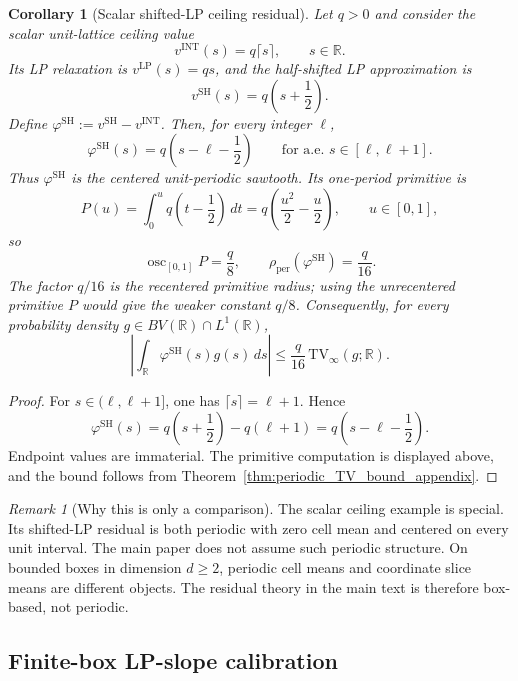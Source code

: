 \documentclass[11pt,letterpaper]{article}
\newtheorem{corollary}[theorem]{Corollary}
\theoremstyle{definition}
\theoremstyle{remark}
\newtheorem{remark}[theorem]{Remark}
\newcommand{\INT}{\mathrm{INT}}
\newcommand{\LP}{\mathrm{LP}}
\newcommand{\SH}{\mathrm{SH}}
\newcommand{\TV}{\mathrm{TV}}
\begin{document}
\begin{corollary}[Scalar shifted-LP ceiling residual]
\label{cor:scalar_shifted_lp_ceiling_residual}
Let $q>0$ and consider the scalar unit-lattice ceiling value
$$
v^{\INT}(s)=q\lceil s\rceil,
\qquad s\in\mathbb R.
$$
Its LP relaxation is $v^{\LP}(s)=qs$, and the half-shifted LP approximation is
$$
v^{\SH}(s)=q\left(s+\frac12\right).
$$
Define $\varphi^{\SH}:=v^{\SH}-v^{\INT}$. Then, for every integer $\ell$,
$$
\varphi^{\SH}(s)
=
q\left(s-\ell-\frac12\right)
\qquad
\text{for a.e. }s\in[\ell,\ell+1].
$$
Thus $\varphi^{\SH}$ is the centered unit-periodic sawtooth. Its one-period
primitive is
$$
P(u)
=
\int_0^u q\left(t-\frac12\right)\,dt
=
q\left(\frac{u^2}{2}-\frac u2\right),
\qquad u\in[0,1],
$$
so
$$
\operatorname{osc}_{[0,1]}P=\frac q8,
\qquad
\rho_{\mathrm{per}}(\varphi^{\SH})=\frac q{16}.
$$
The factor $q/16$ is the recentered primitive radius; using the unrecentered
primitive $P$ would give the weaker constant $q/8$.
Consequently, for every probability density
$g\in BV(\mathbb R)\cap L^1(\mathbb R)$,
\begin{equation}
\label{eq:scalar_shifted_lp_periodic_bound}
\left|
\int_{\mathbb R}\varphi^{\SH}(s)g(s)\,ds
\right|
\le
\frac q{16}\,\TV_\infty(g;\mathbb R).
\end{equation}
\end{corollary}

\begin{proof}
For $s\in(\ell,\ell+1]$, one has $\lceil s\rceil=\ell+1$. Hence
$$
\varphi^{\SH}(s)
=
q\left(s+\frac12\right)-q(\ell+1)
=
q\left(s-\ell-\frac12\right).
$$
Endpoint values are immaterial. The primitive computation is displayed above,
and the bound follows from Theorem~\ref{thm:periodic_TV_bound_appendix}.
\end{proof}

\begin{remark}[Why this is only a comparison]
\label{rem:periodic_only_comparison}
The scalar ceiling example is special. Its shifted-LP residual is both
periodic with zero cell mean and centered on every unit interval. The main
paper does not assume such periodic structure. On bounded boxes in dimension
$d\ge2$, periodic cell means and coordinate slice means are different objects.
The residual theory in the main text is therefore box-based, not periodic.
\end{remark}


  
\subsection{Finite-box LP-slope calibration}
\label{subsec:finite_box_shifted_lp_calibration}
  
\end{document}
